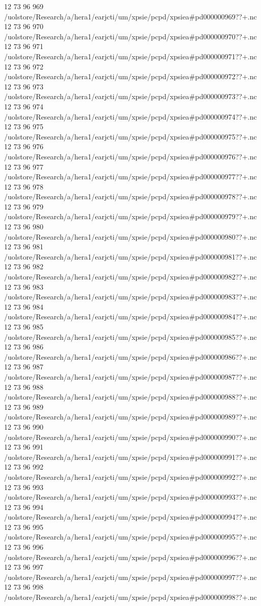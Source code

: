 12 73 96
969
/uolstore/Research/a/hera1/earjcti/um/xpsie/pcpd/xpsiea#pd000000969??+.nc
12 73 96
970
/uolstore/Research/a/hera1/earjcti/um/xpsie/pcpd/xpsiea#pd000000970??+.nc
12 73 96
971
/uolstore/Research/a/hera1/earjcti/um/xpsie/pcpd/xpsiea#pd000000971??+.nc
12 73 96
972
/uolstore/Research/a/hera1/earjcti/um/xpsie/pcpd/xpsiea#pd000000972??+.nc
12 73 96
973
/uolstore/Research/a/hera1/earjcti/um/xpsie/pcpd/xpsiea#pd000000973??+.nc
12 73 96
974
/uolstore/Research/a/hera1/earjcti/um/xpsie/pcpd/xpsiea#pd000000974??+.nc
12 73 96
975
/uolstore/Research/a/hera1/earjcti/um/xpsie/pcpd/xpsiea#pd000000975??+.nc
12 73 96
976
/uolstore/Research/a/hera1/earjcti/um/xpsie/pcpd/xpsiea#pd000000976??+.nc
12 73 96
977
/uolstore/Research/a/hera1/earjcti/um/xpsie/pcpd/xpsiea#pd000000977??+.nc
12 73 96
978
/uolstore/Research/a/hera1/earjcti/um/xpsie/pcpd/xpsiea#pd000000978??+.nc
12 73 96
979
/uolstore/Research/a/hera1/earjcti/um/xpsie/pcpd/xpsiea#pd000000979??+.nc
12 73 96
980
/uolstore/Research/a/hera1/earjcti/um/xpsie/pcpd/xpsiea#pd000000980??+.nc
12 73 96
981
/uolstore/Research/a/hera1/earjcti/um/xpsie/pcpd/xpsiea#pd000000981??+.nc
12 73 96
982
/uolstore/Research/a/hera1/earjcti/um/xpsie/pcpd/xpsiea#pd000000982??+.nc
12 73 96
983
/uolstore/Research/a/hera1/earjcti/um/xpsie/pcpd/xpsiea#pd000000983??+.nc
12 73 96
984
/uolstore/Research/a/hera1/earjcti/um/xpsie/pcpd/xpsiea#pd000000984??+.nc
12 73 96
985
/uolstore/Research/a/hera1/earjcti/um/xpsie/pcpd/xpsiea#pd000000985??+.nc
12 73 96
986
/uolstore/Research/a/hera1/earjcti/um/xpsie/pcpd/xpsiea#pd000000986??+.nc
12 73 96
987
/uolstore/Research/a/hera1/earjcti/um/xpsie/pcpd/xpsiea#pd000000987??+.nc
12 73 96
988
/uolstore/Research/a/hera1/earjcti/um/xpsie/pcpd/xpsiea#pd000000988??+.nc
12 73 96
989
/uolstore/Research/a/hera1/earjcti/um/xpsie/pcpd/xpsiea#pd000000989??+.nc
12 73 96
990
/uolstore/Research/a/hera1/earjcti/um/xpsie/pcpd/xpsiea#pd000000990??+.nc
12 73 96
991
/uolstore/Research/a/hera1/earjcti/um/xpsie/pcpd/xpsiea#pd000000991??+.nc
12 73 96
992
/uolstore/Research/a/hera1/earjcti/um/xpsie/pcpd/xpsiea#pd000000992??+.nc
12 73 96
993
/uolstore/Research/a/hera1/earjcti/um/xpsie/pcpd/xpsiea#pd000000993??+.nc
12 73 96
994
/uolstore/Research/a/hera1/earjcti/um/xpsie/pcpd/xpsiea#pd000000994??+.nc
12 73 96
995
/uolstore/Research/a/hera1/earjcti/um/xpsie/pcpd/xpsiea#pd000000995??+.nc
12 73 96
996
/uolstore/Research/a/hera1/earjcti/um/xpsie/pcpd/xpsiea#pd000000996??+.nc
12 73 96
997
/uolstore/Research/a/hera1/earjcti/um/xpsie/pcpd/xpsiea#pd000000997??+.nc
12 73 96
998
/uolstore/Research/a/hera1/earjcti/um/xpsie/pcpd/xpsiea#pd000000998??+.nc
